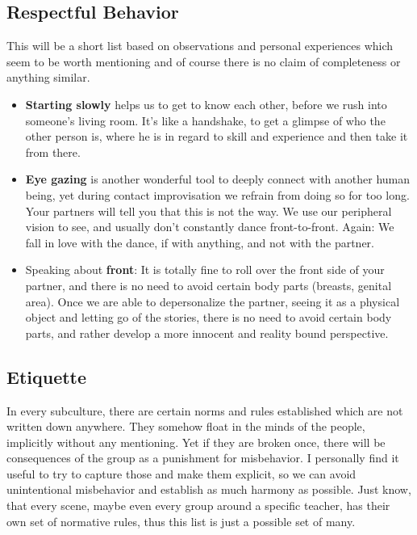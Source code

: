 \subsection{Respectful Behavior}\label{subsec:respectful-behavior}

This will be a short list based on observations and personal experiences which seem to be worth mentioning and of course there is no claim of completeness or anything similar.

\begin{itemize}
    \item \textbf{Starting slowly} helps us to get to know each other, before we rush into someone's living room.
    It's like a handshake, to get a glimpse of who the other person is, where he is in regard to skill and experience and then take it from there.
    \item \textbf{Eye gazing} is another wonderful tool to deeply connect with another human being, yet during contact improvisation we refrain from doing so for too long.
     Your partners will tell you that this is not the way.
     We use our peripheral vision to see, and usually don't constantly dance front-to-front.
     Again: We fall in love with the dance, if with anything, and not with the partner.
    \item Speaking about \textbf{front}: It is totally fine to roll over the front side of your partner, and there is no need to avoid certain body parts (breasts, genital area).
    Once we are able to depersonalize the partner, seeing it as a physical object and letting go of the stories, there is no need to avoid certain body parts, and rather develop a more innocent and reality bound perspective.
\end{itemize}

\subsection{Etiquette}\label{subsec:etiquette}

In every subculture, there are certain norms and rules established which are not written down anywhere.
They somehow float in the minds of the people, implicitly without any mentioning.
Yet if they are broken once, there will be consequences of the group as a punishment for misbehavior.
I personally find it useful to try to capture those and make them explicit, so we can avoid unintentional misbehavior and establish as much harmony as possible.
Just know, that every scene, maybe even every group around a specific teacher, has their own set of normative rules, thus this list is just a possible set of many.

